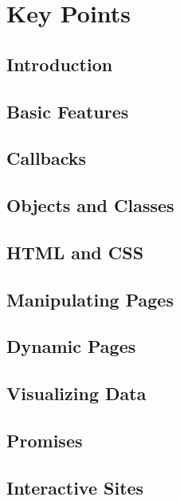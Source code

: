 \chapter{Key Points}\label{s:keypoints}

\section*{Introduction}


\section*{Basic Features}


\section*{Callbacks}


\section*{Objects and Classes}


\section*{HTML and CSS}


\section*{Manipulating Pages}


\section*{Dynamic Pages}


\section*{Visualizing Data}


\section*{Promises}


\section*{Interactive Sites}


